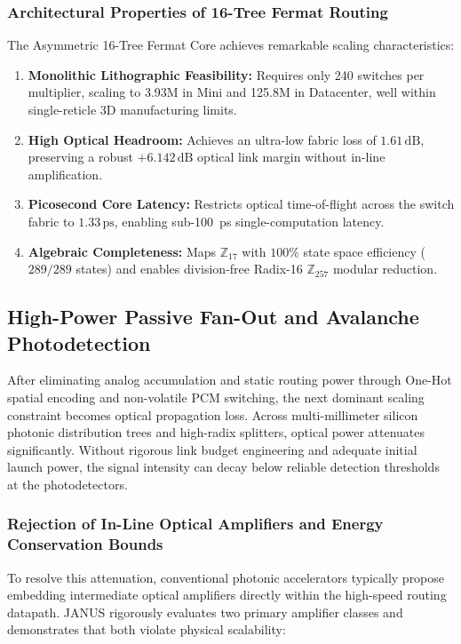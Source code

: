 \documentclass[journal]{IEEEtran}
\begin{document}
\subsubsection{\textbf{Architectural Properties of 16-Tree Fermat Routing}}
The Asymmetric 16-Tree Fermat Core achieves remarkable scaling characteristics:
\begin{enumerate}
\item \textbf{Monolithic Lithographic Feasibility:} Requires only 240 switches per multiplier, scaling to 3.93M in Mini and 125.8M in Datacenter, well within single-reticle 3D manufacturing limits.
\item \textbf{High Optical Headroom:} Achieves an ultra-low fabric loss of $1.61\,\mathrm{dB}$, preserving a robust $+6.142\,\mathrm{dB}$ optical link margin without in-line amplification.
\item \textbf{Picosecond Core Latency:} Restricts optical time-of-flight across the switch fabric to $1.33\,\mathrm{ps}$, enabling sub-100~ps single-computation latency.
\item \textbf{Algebraic Completeness:} Maps $\mathbb{Z}_{17}$ with $100\%$ state space efficiency ($289/289$ states) and enables division-free Radix-16 $\mathbb{Z}_{257}$ modular reduction.
\end{enumerate}

\subsection{\textbf{High-Power Passive Fan-Out and Avalanche Photodetection}}
\label{sec:passive_fanout_apd}

After eliminating analog accumulation and static routing power through One-Hot spatial encoding and non-volatile PCM switching, the next dominant scaling constraint becomes optical propagation loss. Across multi-millimeter silicon photonic distribution trees and high-radix splitters, optical power attenuates significantly. Without rigorous link budget engineering and adequate initial launch power, the signal intensity can decay below reliable detection thresholds at the photodetectors.

\subsubsection{\textbf{Rejection of In-Line Optical Amplifiers and Energy Conservation Bounds}}
To resolve this attenuation, conventional photonic accelerators typically propose embedding intermediate optical amplifiers directly within the high-speed routing datapath. JANUS rigorously evaluates two primary amplifier classes and demonstrates that both violate physical scalability:
\end{document}
